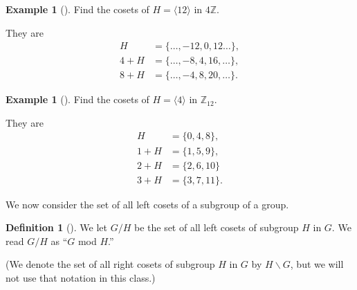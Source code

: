 \documentclass[10pt,]{book}
\theoremstyle{plain}
\theoremstyle{definition}
\newtheorem{definition}[theorem]{Definition}
\theoremstyle{definition}
\theoremstyle{definition}
\newtheorem{example}[theorem]{Example}
\theoremstyle{definition}
\numberwithin{equation}{section}
\def\Z{\mathbb{Z}}
\newcommand{\amp}{&}
\begin{document}
\begin{example}[]\label{example-72}
Find the cosets of \(H=\langle 12\rangle\) in \(4\Z\).%
\par
They are%
\begin{align*}
H\amp =\{\ldots, -12,0,12\ldots\},\\
4+H \amp =
\{\ldots,-8,4,16,\ldots\},\\
8+H\amp =\{\ldots, -4,8,20,\ldots\}.
\end{align*}
%
\end{example}
\begin{example}[]\label{z6_ex}
Find the cosets of \(H=\langle 4\rangle\) in \(\Z_{12}\).%
\par
They are%
\begin{align*}
H\amp =\{0,4,8\},\\
1+H \amp = \{1,5,9\},\\
2+H\amp =\{2,6,10\}\\
3+H\amp =\{3,7,11\}.
\end{align*}
%
\end{example}
We now consider the set of all left cosets of a subgroup of a group.%
\begin{definition}[{}]\label{definition-63}
We let \(G/H\) be the set of all left cosets of subgroup \(H\) in \(G\). We read \(G/H\) as ``\(G\) mod \(H\).''%
\par
(We denote the set of all right cosets of subgroup \(H\) in \(G\) by \(H\backslash G\), but we will  not use that notation in this class.)%
\label{notation-39}
\end{definition}
\typeout{************************************************}
\typeout{************************************************}
\end{document}
